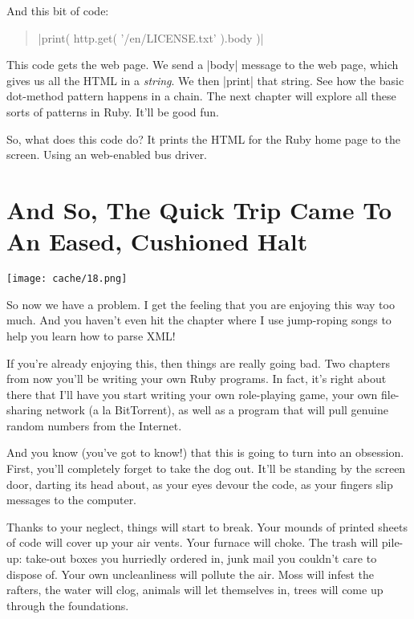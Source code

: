 \documentclass[12pt,twoside]{report}
\begin{document}
And this bit of code:

\begin{quote}
\rubyinline|print( http.get( '/en/LICENSE.txt' ).body )|\end{quote}


This code gets the web page.  We send a
\rubyinline|body| message to the web page, which gives
us all the HTML in a {\em string}.  We then
\rubyinline|print| that string.  See how the basic
dot-method pattern happens in a chain.  The next chapter will explore
all these sorts of patterns in Ruby.  It'll be good fun.

So, what does this code do?  It prints the HTML for the Ruby home page
to the screen.  Using an web-enabled bus driver.


\section{And So, The Quick Trip Came To An Eased, Cushioned Halt}


	\texttt{[image: cache/18.png]}

So now we have a problem.  I get the feeling that you are enjoying
this way too much. And you haven't even hit the chapter where I use
jump-roping songs to help you learn how to parse XML!

If you're already enjoying this, then things are really going bad.
Two chapters from now you'll be writing your own Ruby programs.  In
fact, it's right about there that I'll have you start writing your own
role-playing game, your own file-sharing network (a la BitTorrent), as
well as a program that will pull genuine random numbers from the
Internet.


And you know (you've got to know!) that this is going to turn into an
obsession.  First, you'll completely forget to take the dog out.
It'll be standing by the screen door, darting its head about, as your
eyes devour the code, as your fingers slip messages to the computer.

Thanks to your neglect, things will start to break.  Your mounds of
printed sheets of code will cover up your air vents.  Your furnace
will choke.  The trash will pile-up: take-out boxes you hurriedly
ordered in, junk mail you couldn't care to dispose of.  Your own
uncleanliness will pollute the air.  Moss will infest the rafters, the
water will clog, animals will let themselves in, trees will come up
through the foundations.
\end{document}
